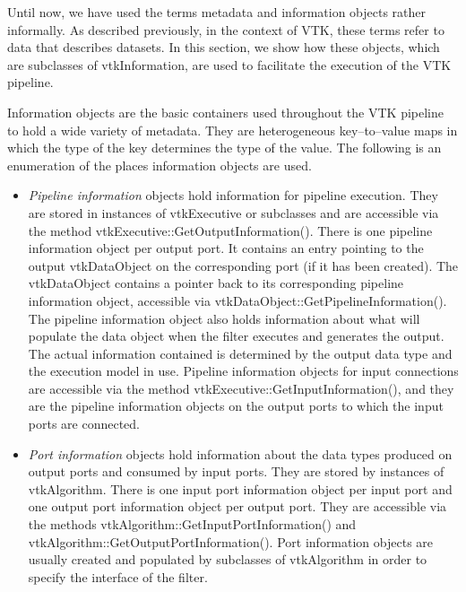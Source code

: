 Until now, we have used the terms metadata and information objects rather informally. As described previously, in the context of VTK, these terms refer to data that describes datasets. In this section, we show how these objects, which are subclasses of vtkInformation, are used to facilitate the execution of the VTK pipeline.

\begin{description}[leftmargin=0cm,labelindent=0cm]
\item[Information Objects.] Information objects are the basic containers used throughout the VTK pipeline to hold a wide variety of metadata. They are heterogeneous key--to--value maps in which the type of the key determines the type of the value. The following is an enumeration of the places information objects are used.

\begin{itemize}

\item \emph{Pipeline information} objects hold information for pipeline execution. They are stored in instances of vtkExecutive or subclasses and are accessible via the method vtkExecutive::GetOutputInformation(). There is one pipeline information object per output port. It contains an entry pointing to the output vtkDataObject on the corresponding port (if it has been created). The vtkDataObject contains a pointer back to its corresponding pipeline information object, accessible via vtkDataObject::GetPipelineInformation(). The pipeline information object also holds information about what will populate the data object when the filter executes and generates the output. The actual information contained is determined by the output data type and the execution model in use. Pipeline information objects for input connections are accessible via the method vtkExecutive::GetInputInformation(), and they are the pipeline information objects on the output ports to which the input ports are connected.

\item \emph{Port information} objects hold information about the data types produced on output ports and consumed by input ports. They are stored by instances of vtkAlgorithm. There is one input port information object per input port and one output port information object per output port. They are accessible via the methods vtkAlgorithm::GetInputPortInformation() and vtkAlgorithm::GetOutputPortInformation(). Port information objects are usually created and populated by subclasses of vtkAlgorithm in order to specify the interface of the filter.


\end{itemize}
\end{description}
